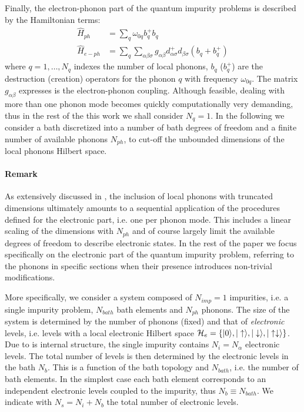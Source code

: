 \documentclass[final,3p,10pt]{elsarticle}
\newcommand{\onlinecite}[1]{\nocite{#1}\hspace{-0.1cm}\citenum{#1}}
\newcommand{\ket}[1]
{|#1\rangle}
\def\a{\alpha}       \def\b{\beta}   \def\g{\gamma}   \def\d{\delta}
\def\up{\uparrow} \def\down{\downarrow} \def\dw{\downarrow}
\begin{document}
Finally, the electron-phonon part of the quantum impurity problems is
described by the Hamiltonian terms: 
\begin{equation}\label{Hph}
  \begin{split}
    \hat{H}_{ph}&=\sum_q \omega_{0q} b_q^+b_q\\
    \hat{H}_{e-ph} &= \sum_q\sum_{\a\b\sigma} g_{\a\b} d^+_{\a\sigma}d_{\b\sigma}(b_q+b_q^+)
\end{split}
\end{equation}
where $q=1,\dots,N_q$ indexes the number of local phonons, $b_q$
($b_q^+$) are the destruction (creation) operators for the phonon $q$
with frequency $\omega_{0q}$. The matrix  $g_{\a\b}$ expresses is the electron-phonon coupling. 
Although feasible, dealing with more than one phonon mode becomes
quickly computationally very demanding, thus in the rest of the this
work we shall consider $N_q=1$. 
In the following we consider a bath discretized into a  number
of bath degrees of freedom and a finite number of available phonons $N_{ph}$,
to cut-off the unbounded dimensions of the local phonons Hilbert space.


\paragraph{{\bf Remark}} As extensively discussed in
\onlinecite{amaricci2022}, the inclusion of local phonons with
truncated dimensions ultimately amounts to a sequential application of
the procedures defined for the electronic part, i.e. one per phonon
mode. This includes a linear scaling of the dimensions with $N_{ph}$
and of course largely limit the available degrees of freedom to
describe electronic states. In the rest of the paper we focus
specifically on the electronic part of the quantum impurity problem,
referring to the phonons in specific sections when their presence
introduces non-trivial modifications.  


More specifically, we consider a system composed of $N_{imp}=1$
impurities, i.e. a single impurity problem, $N_{bath}$ bath elements
and $N_{ph}$ phonons. The size of the system is determined by
the number of phonons (fixed) and that of {\it electronic} levels, i.e. levels with a local
electronic Hilbert space
$\HH_e=\{\ket{0},\ket{\up},\ket{\dw},\ket{\up\dw} \}$. 
Due to is internal structure, the single impurity contains
$N_i= N_\a$ electronic levels.
The total number of levels is then determined by
the electronic levels in the bath $N_b$. This is a function of the bath topology and $N_{bath}$,
i.e. the number of bath elements. In the simplest case each bath
element corresponds to an independent electronic levels coupled to the
impurity, thus $N_b\equiv N_{bath}$. 
We indicate with $N_s=N_i + N_b$ the total number of electronic levels. 
\end{document}
